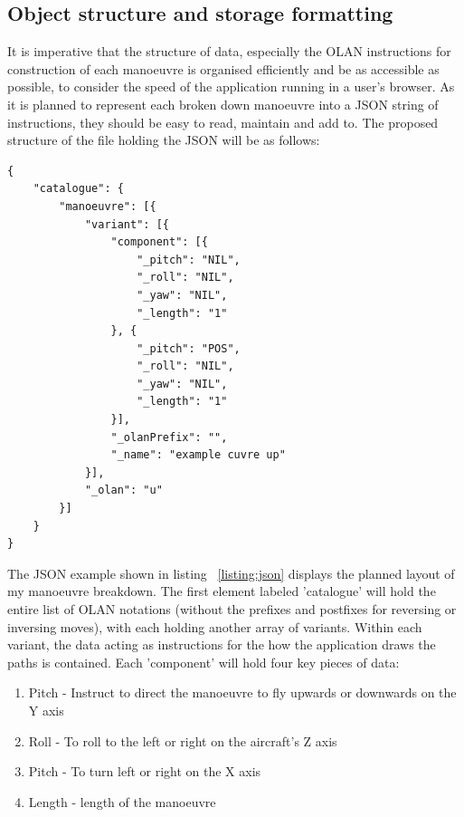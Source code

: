 \clearpage

\subsection{Object structure and storage formatting}
It is imperative that the structure of data, especially the OLAN instructions for construction of each manoeuvre is organised efficiently and be as accessible as possible, to consider the speed of the application running in a user's browser. As it is planned to represent each broken down manoeuvre into a JSON string of instructions, they should be easy to read, maintain and add to. The proposed structure of the file holding the JSON will be as follows:

\lstset{language=JavaScript}
\medskip
\begin{lstlisting}[caption=A JSON means of holding break downs of manouvres with each one holding information on different variants of the move such as inverse and reverse and description of the OLAN notation]
{
    "catalogue": {
        "manoeuvre": [{
            "variant": [{
                "component": [{
                    "_pitch": "NIL",
                    "_roll": "NIL",
                    "_yaw": "NIL",
                    "_length": "1"
                }, {
                    "_pitch": "POS",
                    "_roll": "NIL",
                    "_yaw": "NIL",
                    "_length": "1"
                }],
                "_olanPrefix": "",
                "_name": "example cuvre up"
            }],
            "_olan": "u"
       	}]
   	}
}
\end{lstlisting}
\label{listing:json}

The JSON example shown in listing ~\ref{listing:json} displays the planned layout of my manoeuvre breakdown. The first element labeled 'catalogue' will hold the entire list of OLAN notations (without the prefixes and postfixes for reversing or inversing moves), with each holding another array of variants. Within each variant, the data acting as instructions for the how the application draws the paths is contained. Each 'component' will hold four key pieces of data:

\begin{enumerate}
	\item Pitch - Instruct to direct the manoeuvre to fly upwards or downwards on the Y axis
	\item Roll - To roll to the left or right on the aircraft's Z axis
	\item Pitch - To turn left or right on the X axis
	\item Length - length of the manoeuvre
\end{enumerate}

